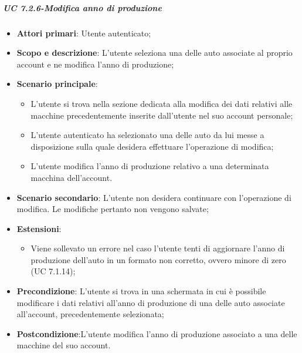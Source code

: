             
            \subparagraph{UC 7.2.6-Modifica anno di produzione}
            \begin{itemize}
                \item \textbf{Attori primari}: Utente autenticato;
                
                \item \textbf{Scopo e descrizione}: L'utente seleziona una delle auto associate al proprio account e ne modifica l'anno di produzione; 
                \item \textbf{Scenario principale}:
                    \begin{itemize}
                        \item L'utente si trova nella sezione dedicata alla modifica dei dati relativi alle macchine precedentemente inserite dall'utente nel suo account personale;
                        \item L'utente autenticato ha selezionato una delle auto da lui messe a disposizione sulla quale desidera effettuare l'operazione di modifica;
                        \item L'utente modifica l'anno di produzione relativo a una determinata macchina dell'account.
                    \end{itemize}
                \item \textbf{Scenario secondario}: L'utente non desidera continuare con l'operazione di modifica. Le modifiche pertanto non vengono salvate;
                \item \textbf{Estensioni}:
                    \begin{itemize}
                        \item Viene sollevato un errore nel caso l'utente tenti di aggiornare l'anno di produzione dell'auto in un formato non corretto, ovvero minore di zero (UC 7.1.14); 
                    \end{itemize}
                \item \textbf{Precondizione}: L'utente si trova in una schermata in cui è possibile modificare i dati relativi all'anno di produzione di una delle auto associate all'account, precedentemente selezionata;
                \item \textbf{Postcondizione}:L'utente modifica l'anno di produzione associato a una delle macchine del suo account.
            \end{itemize}
            
